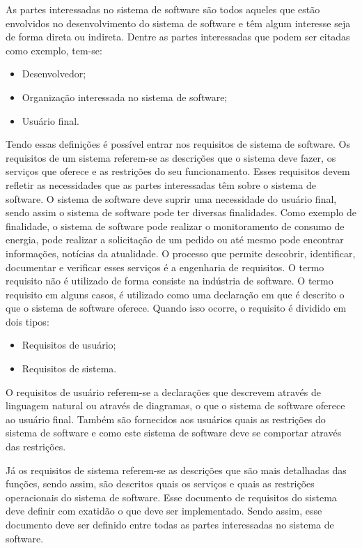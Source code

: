 \documentclass[a4paper,twoside]{article}
\begin{document}
As partes interessadas no sistema de software são todos aqueles que estão envolvidos no desenvolvimento do sistema de software e têm algum interesse seja de forma direta ou indireta. Dentre as partes interessadas que podem ser citadas como exemplo, tem-se\cite{sevocab}:
\begin{itemize}
    \item Desenvolvedor;
    \item Organização interessada no sistema de software;
    \item Usuário final.
\end{itemize}

Tendo essas definições é possível entrar nos requisitos de sistema de software. Os requisitos de um sistema referem-se as descrições que o sistema deve fazer, os serviços que oferece e as restrições do seu funcionamento. Esses requisitos devem refletir as necessidades que as partes interessadas têm sobre o sistema de software. O sistema de software deve suprir uma necessidade do usuário final, sendo assim o sistema de software pode ter diversas finalidades. Como exemplo de finalidade, o sistema de software pode realizar o monitoramento de consumo de energia, pode realizar a solicitação de um pedido ou até mesmo pode encontrar informações, notícias da atualidade. O processo que permite descobrir, identificar, documentar e verificar esses serviços é a engenharia de requisitos\cite{Sommerville_2011_texbook}.
O termo requisito não é utilizado de forma consiste na indústria de software. O termo requisito em alguns casos, é utilizado como uma declaração em que é descrito o que o sistema de software oferece. Quando isso ocorre, o requisito é dividido em dois tipos\cite{Sommerville_2011_texbook}:
\begin{itemize}
    \item Requisitos de usuário;
    \item Requisitos de sistema.
\end{itemize}

O requisitos de usuário referem-se a declarações que descrevem através de linguagem natural ou através de diagramas, o que o sistema de software oferece ao usuário final. Também são fornecidos aos usuários quais as restrições do sistema de software e como este sistema de software deve se comportar através das restrições\cite{Sommerville_2011_texbook}.

Já os requisitos de sistema referem-se as descrições que são mais detalhadas das funções, sendo assim, são descritos quais os serviços e quais as restrições operacionais do sistema de software. Esse documento de requisitos do sistema deve definir com exatidão o que deve ser implementado. Sendo assim, esse documento deve ser definido entre todas as partes interessadas no sistema de software\cite{Sommerville_2011_texbook}.
\end{document}
